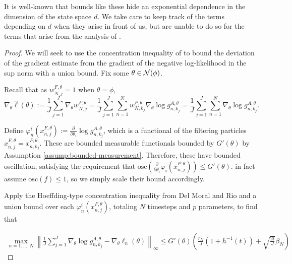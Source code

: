 \documentclass{article}
\begin{document}
It is well-known that bounds like these hide an exponential dependence in the dimension of the state space $d$. We take care to keep track of the terms depending on $d$ when they arise in front of us, but are unable to do so for the terms that arise from the analysis of \cite{delmoral2011ci}. 


\begin{proof}


We will seek to use the concentration inequality of \cite{delmoral2011ci} to bound the deviation of the gradient estimate from the gradient of the negative log-likelihood in the sup norm with a union bound. Fix some $\theta \in {\mathcal{N}}(\phi)$.


Recall that as $w_{N, j}^{F, \theta}=1$ when $\theta=\phi$,
$$
\nabla_\theta \hat{\ell}(\theta):=\frac{1}{J} \sum_{j=1}^J \nabla_\theta w_{N, j}^{F, \theta}=\frac{1}{J} \sum_{j=1}^J\sum_{n=1}^N  w_{N, k_j}^{P, \theta} \nabla_\theta \log g_{n,k_j}^{A,\theta} = \frac{1}{J} \sum_{j=1}^J\sum_{n=1}^N \nabla_\theta \log g_{n,k_j}^{A,\theta}.
$$

Define $\varphi_n^i(x_{n,j}^{F,\theta}) := \frac{\partial}{\partial\theta_i} \log g_{n,k_j}^{A,\theta}$, which is a functional of the filtering particles $x_{n,j}^{F,\theta} = x_{n,k_j}^{P,\theta}$. These are bounded measurable functionals bounded by $G'(\theta)$ by Assumption \ref{assump:bounded-measurement}. Therefore, these have bounded oscillation, satisfying the requirement that $\text{osc} \left(\frac{\partial}{\partial\theta_i} \varphi_i(x_{n,j}^{P,\theta}) \right) \leq G'(\theta)$. \cite{delmoral2011ci} in fact assume $\text{osc}(f) \leq 1$, so we simply scale their bound accordingly.


Apply the Hoeffding-type concentration inequality from Del Moral and Rio \cite{delmoral2011ci} and a union bound over each $\varphi_n^i(x_{n,j}^{F,\theta})$, totaling $N$ timesteps and $p$ parameters, to find that

\begin{align}
    \max_{n=1,...,N} \left\lVert\frac{1}{J}\sum_{j=1}^J\nabla_\theta \log g_{n,k_j}^{A,\theta} - \nabla_\theta \ell_n(\theta) \right\rVert_{\infty} \leq G'(\theta)\left(\frac{r_N}{J}(1+h^{-1}(t)) + \sqrt{\frac{2t}{J}}\beta_N \right)
\end{align}


\end{proof}
\end{document}
